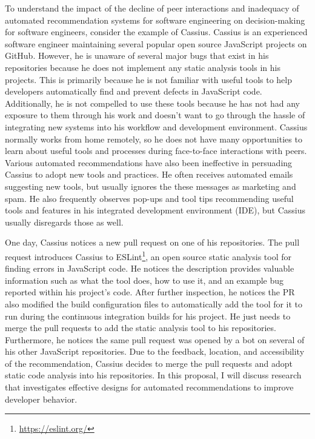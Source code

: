 To understand the impact of the decline of peer interactions and inadequacy of automated recommendation systems for software engineering on decision-making for software engineers, consider the example of Cassius. Cassius is an experienced software engineer maintaining several popular open source JavaScript projects on GitHub. However, he is unaware of several major bugs that exist in his repositories because he does not implement any static analysis tools in his projects. This is primarily because he is not familiar with useful tools to help developers automatically find and prevent defects in JavaScript code. Additionally, he is not compelled to use these tools because he has not had any exposure to them through his work and doesn't want to go through the hassle of integrating new systems into his workflow and development environment. Cassius normally works from home remotely, so he does not have many opportunities to learn about useful tools and processes during face-to-face interactions with peers. Various automated recommendations have also been ineffective in persuading Cassius to adopt new tools and practices. He often receives automated emails suggesting new tools, but usually ignores the these messages as marketing and spam. He also frequently observes pop-ups and tool tips recommending useful tools and features in his integrated development environment (IDE), but Cassius usually disregards those as well.


One day, Cassius notices a new pull request on one of his repositories. The pull request introduces Cassius to ESLint\footnote{\url{https://eslint.org/}}, an open source static analysis tool for finding errors in JavaScript code. He notices the description provides valuable information such as what the tool does, how to use it, and an example bug reported within his project's code. After further inspection, he notices the PR also modified the build configuration files to automatically add the tool for it to run during the continuous integration builds for his project. He just needs to merge the pull requests to add the static analysis tool to his repositories. Furthermore, he notices the same pull request was opened by a bot on several of his other JavaScript repositories. Due to the feedback, location, and accessibility of the recommendation, Cassius decides to merge the pull requests and adopt static code analysis into his repositories. In this proposal, I will discuss research that investigates effective designs for automated recommendations to improve developer behavior.

